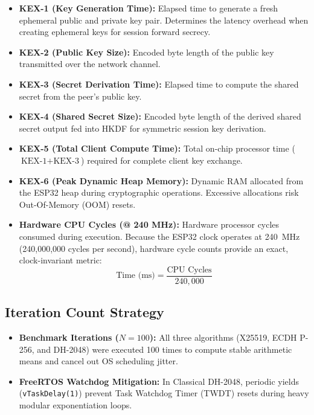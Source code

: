 \documentclass[11pt,a4paper]{article}
\begin{document}
\begin{itemize}
    \item \textbf{KEX-1 (Key Generation Time):} Elapsed time to generate a fresh ephemeral public and private key pair. Determines the latency overhead when creating ephemeral keys for session forward secrecy.
    \item \textbf{KEX-2 (Public Key Size):} Encoded byte length of the public key transmitted over the network channel.
    \item \textbf{KEX-3 (Secret Derivation Time):} Elapsed time to compute the shared secret from the peer's public key.
    \item \textbf{KEX-4 (Shared Secret Size):} Encoded byte length of the derived shared secret output fed into HKDF for symmetric session key derivation.
    \item \textbf{KEX-5 (Total Client Compute Time):} Total on-chip processor time ($\text{KEX-1} + \text{KEX-3}$) required for complete client key exchange.
    \item \textbf{KEX-6 (Peak Dynamic Heap Memory):} Dynamic RAM allocated from the ESP32 heap during cryptographic operations. Excessive allocations risk Out-Of-Memory (OOM) resets.
    \item \textbf{Hardware CPU Cycles (@ 240 MHz):} Hardware processor cycles consumed during execution. Because the ESP32 clock operates at 240~MHz (240,000,000 cycles per second), hardware cycle counts provide an exact, clock-invariant metric:
    \begin{equation}
    \text{Time (ms)} = \frac{\text{CPU Cycles}}{240,000}
    \end{equation}
\end{itemize}

\subsection{Iteration Count Strategy}

\begin{itemize}
    \item \textbf{Benchmark Iterations ($N = 100$):} All three algorithms (X25519, ECDH P-256, and DH-2048) were executed 100 times to compute stable arithmetic means and cancel out OS scheduling jitter.
    \item \textbf{FreeRTOS Watchdog Mitigation:} In Classical DH-2048, periodic yields (\texttt{vTaskDelay(1)}) prevent Task Watchdog Timer (TWDT) resets during heavy modular exponentiation loops.
\end{itemize}
\end{document}
